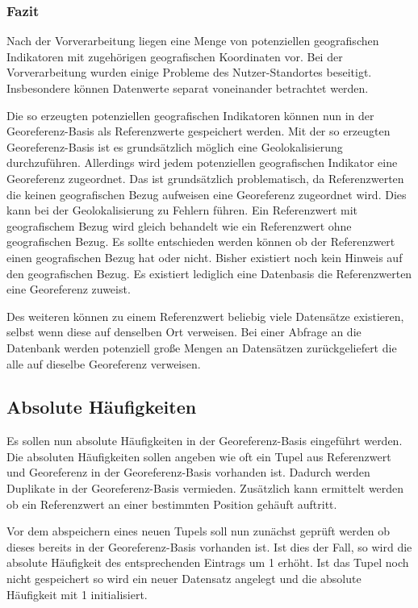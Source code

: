 			\subsubsection{Fazit} 

				Nach der Vorverarbeitung liegen eine Menge von potenziellen geografischen Indikatoren mit zugehörigen geografischen Koordinaten vor.
				Bei der Vorverarbeitung wurden einige Probleme des Nutzer-Standortes beseitigt.
				Insbesondere können Datenwerte separat voneinander betrachtet werden.

				Die so erzeugten potenziellen geografischen Indikatoren können nun in der Georeferenz-Basis als Referenzwerte gespeichert werden.
				Mit der so erzeugten Georeferenz-Basis ist es grundsätzlich möglich eine Geolokalisierung durchzuführen. 
				Allerdings wird jedem potenziellen geografischen Indikator eine Georeferenz zugeordnet.
				Das ist grundsätzlich problematisch, da Referenzwerten die keinen geografischen Bezug aufweisen eine Georeferenz zugeordnet wird. 
				Dies kann bei der Geolokalisierung zu Fehlern führen.
				Ein Referenzwert mit geografischem Bezug wird gleich behandelt wie ein Referenzwert ohne geografischen Bezug.
				Es sollte entschieden werden können ob der Referenzwert einen geografischen Bezug hat oder nicht.
				Bisher existiert noch kein Hinweis auf den geografischen Bezug.
				Es existiert lediglich eine Datenbasis die Referenzwerten eine Georeferenz zuweist. 

				Des weiteren können zu einem Referenzwert beliebig viele Datensätze existieren, selbst wenn diese auf denselben Ort verweisen. 
				Bei einer Abfrage an die Datenbank werden potenziell große Mengen an Datensätzen zurückgeliefert die alle auf dieselbe Georeferenz verweisen.

		\subsection{Absolute Häufigkeiten}

			Es sollen nun absolute Häufigkeiten in der Georeferenz-Basis eingeführt werden.
			Die absoluten Häufigkeiten sollen angeben wie oft ein Tupel aus Referenzwert und Georeferenz in der Georeferenz-Basis vorhanden ist.
			Dadurch werden Duplikate in der Georeferenz-Basis vermieden.
			Zusätzlich kann ermittelt werden ob ein Referenzwert an einer bestimmten Position gehäuft auftritt.

			Vor dem abspeichern eines neuen Tupels soll nun zunächst geprüft werden ob dieses bereits in der Georeferenz-Basis vorhanden ist. 
			Ist dies der Fall, so wird die absolute Häufigkeit des entsprechenden Eintrags um 1 erhöht.
			Ist das Tupel noch nicht gespeichert so wird ein neuer Datensatz angelegt und die absolute Häufigkeit mit 1 initialisiert.

